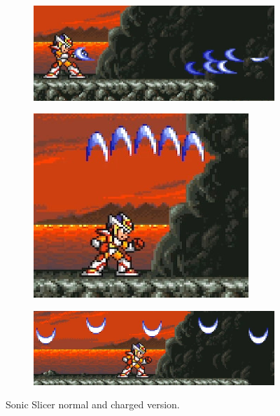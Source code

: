 \begin{figure}[htp]
	\centering
	\begin{subfigure}[t]{0.45\linewidth}
		\includegraphics[width=\linewidth]{figures/X2/weapons/S_slicer_1.png}	
	\end{subfigure}
	\begin{subfigure}[t]{0.35\linewidth}
		\centering
		\includegraphics[width=\linewidth]{figures/X2/weapons/S_slicer_2.png}	
	\end{subfigure}
	\begin{subfigure}[t]{0.81\linewidth}
		\centering
		\includegraphics[width=\linewidth]{figures/X2/weapons/S_slicer_3.png}	
	\end{subfigure}
	\caption{Sonic Slicer normal and charged version.}
\end{figure}


